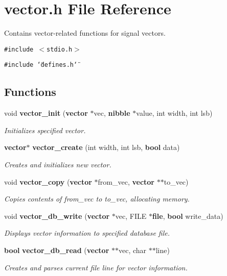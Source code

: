 \section{vector.h File Reference}
\label{vector_8h}
Contains vector-related functions for signal vectors. 


{\tt \#include $<$stdio.h$>$}\par
{\tt \#include \char`\"{}defines.h\char`\"{}}\par
\subsection*{Functions}
\begin{CompactItemize}
\item 
void {\bf vector\_\-init} ({\bf vector} $\ast$vec, {\bf nibble} $\ast$value, int width, int lsb)
\begin{CompactList}\small\item\em Initializes specified vector.\item\end{CompactList}\item 
{\bf vector}$\ast$ {\bf vector\_\-create} (int width, int lsb, {\bf bool} data)
\begin{CompactList}\small\item\em Creates and initializes new vector.\item\end{CompactList}\item 
void {\bf vector\_\-copy} ({\bf vector} $\ast$from\_\-vec, {\bf vector} $\ast$$\ast$to\_\-vec)
\begin{CompactList}\small\item\em Copies contents of from\_\-vec to to\_\-vec, allocating memory.\item\end{CompactList}\item 
void {\bf vector\_\-db\_\-write} ({\bf vector} $\ast$vec, FILE $\ast${\bf file}, {\bf bool} write\_\-data)
\begin{CompactList}\small\item\em Displays vector information to specified database file.\item\end{CompactList}\item 
{\bf bool} {\bf vector\_\-db\_\-read} ({\bf vector} $\ast$$\ast$vec, char $\ast$$\ast$line)
\begin{CompactList}\small\item\em Creates and parses current file line for vector information.\item\end{CompactList}\item 
$$
\end{CompactItemize}
